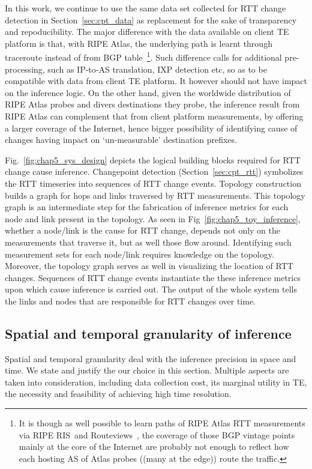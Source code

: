 In this work, we continue to use the same data set collected for RTT change detection in Section~\ref{sec:cpt_data} as replacement for the sake of transparency and repoducibility. The major difference with the data available on client TE platform is that, with RIPE Atlas, the underlying path is learnt through traceroute instead of from BGP table~\footnote{It is though as well possible to learn paths of RIPE Atlas RTT measurements via RIPE RIS~\cite{ris}and Routeviews~\cite{routeviews}, the coverage of those BGP vintage points mainly at the core of the Internet are probably not enough to reflect how each hosting AS of Atlas probes ((many at the edge)) route the traffic.}. 
Such difference calls for additional pre-processing, such as IP-to-AS translation, IXP detection etc, so as to be compatible with data from client TE platform. It however should not have impact on the inference logic. On the other hand, given the worldwide distribution of RIPE Atlas probes and divers destinations they probe, the inference result from RIPE Atlas can complement that from client platform measurements, by offering a larger coverage of the Internet, hence bigger possibility of identifying cause of changes having impact on `un-measurable' destination prefixes.

Fig.~\ref{fig:chap5_sys_design} depicts the logical building blocks required for RTT change cause inference. Changepoint detection (Section~\ref{sec:cpt_rtt}) symbolizes the RTT timeseries into sequences of RTT change events.
Topology construction builds a graph for hops and links traversed by RTT measurements.
This topology graph is an intermediate step for the fabrication of inference metrics for each node and link present in the topology. As seen in Fig~\ref{fig:chap5_toy_inference}, whether a node/link is the cause for RTT change, depends not only on the measurements that traverse it, but as well those flow around. Identifying such measurement sets for each node/link requires knowledge on the topology. Moreover, the topology graph serves as well in visualizing the location of RTT changes. 
Sequences of RTT change events instantiate the these inference metrics upon which cause inference is carried out.
The output of the whole system tells the links and nodes that are responsible for RTT changes over time.

\subsection{Spatial and temporal granularity of inference}
Spatial and temporal granularity deal with the inference precision in space and time.
We state and justify the our choice in this section. Multiple aspects are taken into consideration, including data collection cost, its marginal utility in TE, the necessity and feasibility of achieving high time resolution.

